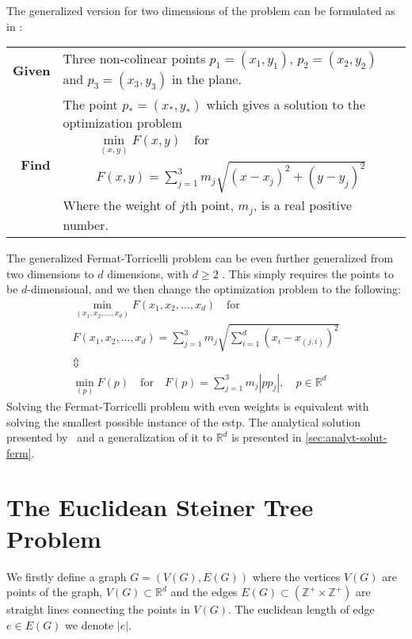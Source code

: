 The generalized version for two dimensions of the problem can be formulated as in
\textcite{uteshev2014}:
%
\begin{center}
  \begin{tabular}{rp{9cm}}
    \toprule
    \textbf{Given} & Three non-colinear points $p_1 = (x_1, y_1)$, $p_2 = (x_2,
                     y_2)$ and $p_3 = (x_3, y_3)$ in the plane. \\
    \textbf{Find} & The point $p_\ast = (x_\ast, y_\ast)$ which gives a solution
                    to the optimization problem
                    \begin{gather}
                      \min_{(x,y)} F(x,y) \quad \text{for} \\
                      F(x,y) = \sum_{j=1}^3 m_j \sqrt{{(x-x_j)}^2 + {(y-y_j)}^2}
                    \end{gather}
    Where the weight of $j$th point, $m_j$, is a real positive number. \\
    \bottomrule
  \end{tabular}
\end{center}
%
The generalized Fermat-Torricelli problem can be even further generalized from
two dimensions to $d$ dimensions, with $d \ge 2$
\cite{fermattorricelliproblem}. This simply requires the points to be
$d$-dimensional, and we then change the optimization problem to the following:
%
\begin{gather}
  \min_{(x_1, x_2, \ldots, x_d)} F(x_1, x_2, \ldots, x_d) \quad \text{for} \\
  F(x_1, x_2, \ldots, x_d) = \sum_{j=1}^3 m_j
  \sqrt{\sum_{i=1}^d {(x_i - x_{(j,i)})}^2 }
  \\ \Updownarrow \\
  \label{eq:4}
  \min_{(p)} F(p) \quad \text{for} \quad
  F(p) = \sum_{j=1}^3 m_j | p p_j |, \quad p \in \mathbb{R}^d
\end{gather}
%
Solving the Fermat-Torricelli problem with even weights is equivalent with solving
the smallest possible instance of the \acl{estp}. The analytical solution
presented by~\textcite{uteshev2014} and a generalization of it to $\mathbb{R}^d$ is
presented in \cref{sec:analyt-solut-ferm}.

\section{The Euclidean Steiner Tree Problem}
\label{sec:eucl-stein-tree}

We firstly define a graph $G = (V(G), E(G))$ where the vertices $V(G)$ are
points of the graph, $V(G) \subset \mathbb{R}^d$ and the edges
$E(G) \subset (\mathbb{Z}^{+} \times \mathbb{Z}^{+})$ are straight lines
connecting the points in $V(G)$. The euclidean length of edge $e \in E(G)$ we
denote $|e|$.

